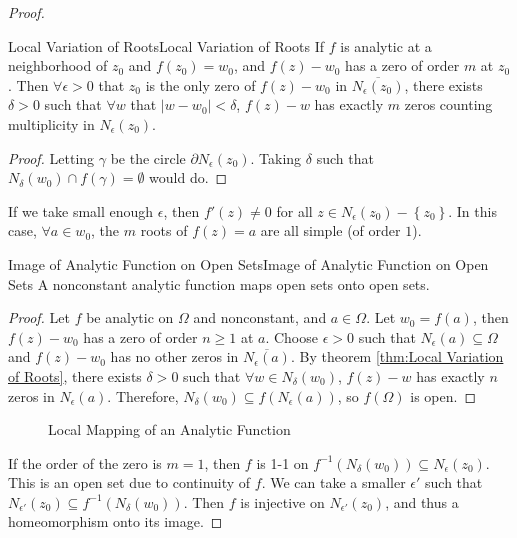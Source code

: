 \documentclass[../main.tex]{subfiles}
\begin{document}
\begin{proof}
\begin{theorem}{Local Variation of Roots}{Local Variation of Roots}
	If $f$ is analytic at a neighborhood of $z_0$ and $f(z_0)=w_0$, and $f(z)-w_0$ has a zero of order $m$ at $z_0$. Then $\forall \epsilon>0$ that $z_0$ is the only zero of $f(z)-w_0$ in $\overline{N_\epsilon(z_0)}$, there exists $\delta>0$ such that $\forall w$ that $\left|w-w_0\right|<\delta$, $f(z)-w$ has exactly $m$ zeros counting multiplicity in $N_\epsilon(z_0)$.
\end{theorem}
\begin{proof}
Letting $\gamma$ be the circle $\partial N_{\epsilon}(z_0)$. Taking $\delta$ such that $N_{\delta}(w_0)\cap f(\gamma) = \emptyset $ would do.
\end{proof}
\begin{remark}
	If we take small enough $\epsilon$, then $f'(z)\neq 0$ for all $z\in N_\epsilon(z_0)-\left\{ z_0 \right\}$. In this case, $\forall a\in w_0$, the $m$ roots of $f(z) = a$ are all simple (of order $1$).
\end{remark}

\begin{corollary}{Image of Analytic Function on Open Sets}{Image of Analytic Function on Open Sets}
A nonconstant analytic function maps open sets onto open sets.
\end{corollary}
\begin{proof}
	Let $f$ be analytic on $\Omega$ and nonconstant, and $a\in \Omega$. Let $w_0 = f(a)$, then $f(z)-w_0$ has a zero of order $n\geq 1$ at $a$. Choose $\epsilon>0$ such that $N_\epsilon(a) \subseteq \Omega$ and $f(z)-w_0$ has no other zeros in $\overline{N_\epsilon(a)}$. By theorem \ref{thm:Local Variation of Roots}, there exists $\delta>0$ such that $\forall w\in N_\delta(w_0)$, $f(z)-w$ has exactly $n$ zeros in $N_\epsilon(a)$. Therefore, $N_\delta(w_0) \subseteq f(N_\epsilon(a))$, so $f(\Omega)$ is open.
\end{proof}

\begin{figure}[ht]
    \centering
    \caption{Local Mapping of an Analytic Function}
    \label{fig:local-mapping-of-an-analytic-function}
\end{figure}


If the order of the zero is $m=1$, then $f$ is 1-1 on $f^{-1}(N_{\delta}(w_0)) \subseteq N_{\epsilon}(z_0)$. This is an open set due to continuity of $f$. We can take a smaller $\epsilon'$ such that $N_{\epsilon'}(z_0) \subseteq f^{-1}(N_{\delta}(w_0))$. Then $f$ is injective on $N_{\epsilon'}(z_0)$, and thus a homeomorphism onto its image.


\end{proof}
\end{document}

